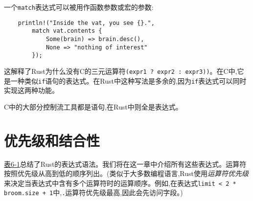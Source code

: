 一个\texttt{match}表达式可以被用作函数参数或宏的参数:
\begin{verbatim}
    println!("Inside the vat, you see {}.",
        match vat.contents {
            Some(brain) => brain.desc(),
            None => "nothing of interest"
        });
\end{verbatim}

这解释了Rust为什么没有C的三元运算符\texttt{(expr1 ? expr2 : expr3))}。在C中,它是一种类似\texttt{if}语句的表达式。在Rust中这种写法是多余的,因为\texttt{if}表达式可以同时实现这两种功能。

C中的大部分控制流工具都是语句,在Rust中则全是表达式。

\section{优先级和结合性}

\hyperref[t6-1]{表6-1}总结了Rust的表达式语法。我们将在这一章中介绍所有这些表达式。运算符按照优先级从高到低的顺序列出。(类似于大多数编程语言,Rust使用\emph{运算符优先级}来决定当表达式中含有多个运算符时的运算顺序。例如,在表达式\texttt{limit < 2 * broom.size + 1}中,\texttt{.}运算符优先级最高,因此会先访问字段。)

